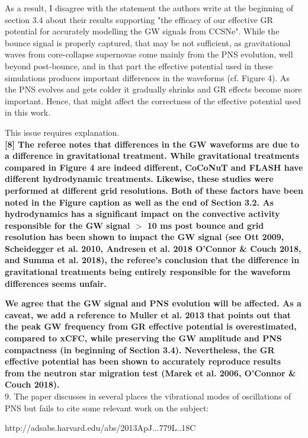 \documentclass[11pt]{article}
\begin{document}
As a result, I disagree with the statement the authors write at the beginning of 
section 3.4 about their results supporting "the efficacy of our effective GR 
potential for accurately modelling the GW signals from CCSNe". While the bounce signal is properly captured, that may be not sufficient, as gravitational waves from core-collapse supernovae come mainly from the PNS evolution, well beyond post-bounce, and in that part the effective potential used in these simulations produces important differences in the waveforms (cf. Figure 4). As the PNS evolves and gets colder it gradually shrinks and GR effects become more important. Hence, that might affect the correctness of the effective potential used in this work.

This issue requires explanation.\\

\textbf{[8] The referee notes that differences in the GW waveforms are due to a difference in gravitational treatment.  While gravitational treatments compared in Figure 4 are indeed different, CoCoNuT and FLASH have different hydrodynamic treatments.  Likewise, these studies were performed at different grid resolutions.  Both of these factors have been noted in the Figure caption as well as the end of Section 3.2.  As hydrodynamics has a significant impact on the convective activity responsible for the GW signal $>$ 10 ms post bounce and grid resolution has been shown to impact the GW signal (see Ott 2009, Scheidegger et al. 2010, Andresen et al. 2018 O'Connor \& Couch 2018, and Summa et al. 2018), the referee's conclusion that the difference in gravitational treatments being entirely responsible for the waveform differences seems unfair.}

\textbf{We agree that the GW signal and PNS evolution will be affected.  As a caveat, we add a reference to Muller et al. 2013 that points out that the peak GW frequency from GR effective potential is overestimated, compared to xCFC, while preserving the GW amplitude and PNS compactness (in beginning of Section 3.4).  Nevertheless, the GR effective potential has been shown to accurately reproduce results from the neutron star migration test (Marek et al. 2006, O'Connor \& Couch 2018).}\\

9. The paper discusses in several places the vibrational modes of oscillations of
PNS but fails to cite some relevant work on the subject:

http://adsabs.harvard.edu/abs/2013ApJ...779L..18C
\end{document}
